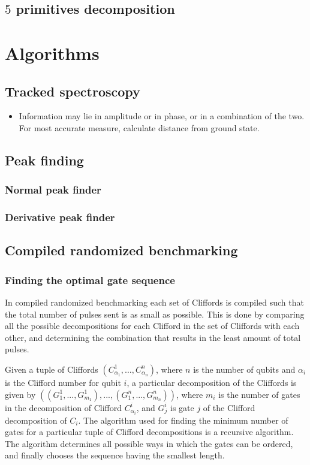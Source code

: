     \section{$5$ primitives decomposition}
      \label{sec:5 primitives decomposition}

\chapter{Algorithms}
  \section{Tracked spectroscopy}
  \label{sec:Tracked spectroscopy}
    \begin{itemize}
      \item Information may lie in amplitude or in phase, or in a combination of the two. For most accurate measure, calculate distance from ground state.
    \end{itemize}
  \section{Peak finding}
    \subsection{Normal peak finder}
    \subsection{Derivative peak finder}
  \section{Compiled randomized benchmarking}
    \label{sec:compiled randomized benchmarking algorithm}
    \subsection{Finding the optimal gate sequence}
      In compiled randomized benchmarking each set of Cliffords is compiled such that the total number of pulses sent is as small as possible. This is done by comparing all the possible decompositions for each Clifford in the set of Cliffords with each other, and determining the combination that results in the least amount of total pulses.

      Given a tuple of Cliffords $\left(C_{\alpha_1}^1, \dots, C_{\alpha_n}^n\right)$, where $n$ is the number of qubits and $\alpha_i$ is the Clifford number for qubit $i$, a particular decomposition of the Cliffords is given by $\left(\left( G_1^1, ..., G_{m_1}^1 \right) , ..., \left(G_1^n, ..., G_{m_n}^n\right)\right)$, where $m_i$ is the number of gates in the decomposition of Clifford $C_{\alpha_i}^i$, and $G_j^i$ is gate $j$ of the Clifford decomposition of $C_i$. The algorithm used for finding the minimum number of gates for a particular tuple of Clifford decompositions is a recursive algorithm. The algorithm determines all possible ways in which the gates can be ordered, and finally chooses the sequence having the smallest length.

